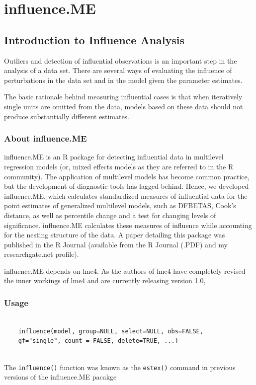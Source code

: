 \documentclass[12pt, a4paper]{report}
\begin{document}
	\chapter{influence.ME}


\section*{Introduction to Influence Analysis}

Outliers and detection of influential observations is an important step in the analysis of a data set. There are several ways of evaluating the influence of perturbations in the data set and in the model given the parameter estimates. 

The basic rationale behind measuring influential cases is that when iteratively single units are omitted
from the data, models based on these data should not produce substantially different estimates.

\subsection{About influence.ME}
influence.ME is an R package for detecting influential data in multilevel regression models (or, mixed effects models as they are referred to in the R community). The application of multilevel models has become common practice, but the development of diagnostic tools has lagged behind. Hence, we developed influence.ME, which calculates standardized measures of influential data for the point estimates of generalized multilevel models, such as DFBETAS, Cook’s distance, as well as percentile change and a test for changing levels of significance. influence.ME calculates these measures of influence while accounting for the nesting structure of the data. A paper detailing this package was published in the R Journal (available from the R Journal (.PDF) and my researchgate.net profile).

influence.ME depends on lme4. As the authors of lme4 have completely revised the inner workings of lme4 and are currently releasing version 1.0, 



\subsection*{Usage}
\begin{framed}
	\begin{verbatim}
	
	influence(model, group=NULL, select=NULL, obs=FALSE, 
	gf="single", count = FALSE, delete=TRUE, ...)
	
	\end{verbatim}
\end{framed}
The \texttt{influence()} function was known as the \texttt{estex()} command in previous versions of the influence.ME pacakge
	
\end{document}

